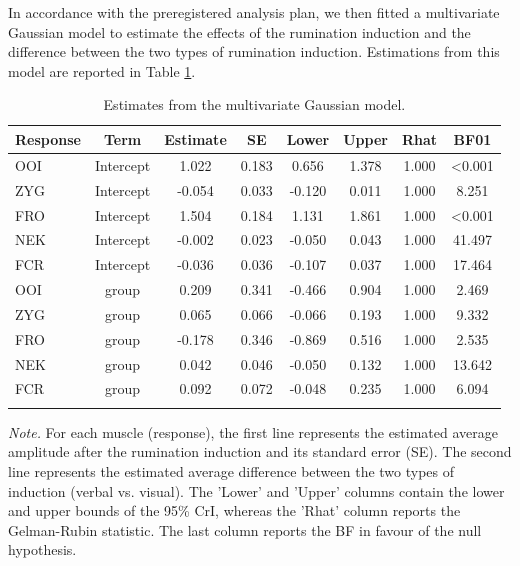 \documentclass[a4paper,12pt,twoside,onecolumn,openright,final,oldfontcommands]{memoir}
\begin{document}
In accordance with the preregistered analysis plan, we then fitted a multivariate Gaussian model to estimate the effects of the rumination induction and the difference between the two types of rumination induction. Estimations from this model are reported in Table \ref{tab:outputbmod1}.

\begin{table}[H]
\begin{center}
\begin{threeparttable}
\caption{\label{tab:outputbmod1}Estimates from the multivariate Gaussian model.}
\small{
\begin{tabular}{lccccccc}
\toprule
Response & \multicolumn{1}{c}{Term} & \multicolumn{1}{c}{Estimate} & \multicolumn{1}{c}{SE} & \multicolumn{1}{c}{Lower} & \multicolumn{1}{c}{Upper} & \multicolumn{1}{c}{Rhat} & \multicolumn{1}{c}{BF01}\\
\midrule
OOI & Intercept & 1.022 & 0.183 & 0.656 & 1.378 & 1.000 & <0.001\\
ZYG & Intercept & -0.054 & 0.033 & -0.120 & 0.011 & 1.000 & 8.251\\
FRO & Intercept & 1.504 & 0.184 & 1.131 & 1.861 & 1.000 & <0.001\\
NEK & Intercept & -0.002 & 0.023 & -0.050 & 0.043 & 1.000 & 41.497\\
FCR & Intercept & -0.036 & 0.036 & -0.107 & 0.037 & 1.000 & 17.464\\
OOI & group & 0.209 & 0.341 & -0.466 & 0.904 & 1.000 & 2.469\\
ZYG & group & 0.065 & 0.066 & -0.066 & 0.193 & 1.000 & 9.332\\
FRO & group & -0.178 & 0.346 & -0.869 & 0.516 & 1.000 & 2.535\\
NEK & group & 0.042 & 0.046 & -0.050 & 0.132 & 1.000 & 13.642\\
FCR & group & 0.092 & 0.072 & -0.048 & 0.235 & 1.000 & 6.094\\
\bottomrule
\addlinespace
\end{tabular}
}
\begin{tablenotes}[para]
\textit{Note.} For each muscle (response), the first line represents the estimated average
amplitude after the rumination induction and its standard error (SE). The second line
represents the estimated average difference between the two types of induction (verbal vs. visual). The 'Lower' and 'Upper' columns contain the lower and upper bounds of the 95\% CrI, whereas the 'Rhat' column reports the Gelman-Rubin statistic. The last column reports the BF in favour of the null hypothesis.
\end{tablenotes}
\end{threeparttable}
\end{center}
\end{table}
\end{document}
